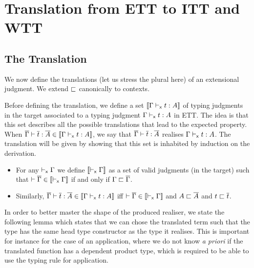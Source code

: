 \chapter{Translation from \acrshort{ETT} to \acrshort{ITT} and \acrshort{WTT}}

\section{The Translation}

We now define the translations (let us stress the plural here) of an
extensional judgment. We extend $\sqsubset$ canonically to contexts.

Before defining the translation, we define a set
$\llbracket \Gamma \vdash_{\mathsf{x}} t : A \rrbracket$ of typing judgments in the target associated to a
typing judgment $\Gamma \vdash_{\mathsf{x}} t : A$ in \acrshort{ETT}.
%
The idea is that this set describes all the possible translations that
lead to the expected property. When
$\overline{\Gamma} \vdash \overline{t} : \overline{A} \in \llbracket \Gamma \vdash_{\mathsf{x}} t : A \rrbracket$, we say that
$\overline{\Gamma} \vdash \overline{t} : \overline{A}$ realises $\Gamma \vdash_{\mathsf{x}} t : A$. The
translation will be given by showing that this set is inhabited by
induction on the derivation.

\begin{definition}
  \leavevmode
  \begin{itemize}
    \item For any $\vdash_{\mathsf{x}} \Gamma$ we define $\llbracket \vdash_{\mathsf{x}} \Gamma \rrbracket$ as a set of
    valid judgments (in the target) such that
    $\vdash \overline{\Gamma} \in \llbracket \vdash_{\mathsf{x}} \Gamma \rrbracket$ if and only if $\Gamma \sqsubset \overline{\Gamma}$.

    \item Similarly, $\overline{\Gamma} \vdash \overline{t} : \overline{A} \in \llbracket \Gamma \vdash_{\mathsf{x}} t : A \rrbracket$
    iff $\vdash \overline{\Gamma} \in \llbracket \vdash_{\mathsf{x}} \Gamma \rrbracket$ and $A \sqsubset \overline{A}$ and $t \sqsubset \overline{t}$.
  \end{itemize}
\end{definition}

In order to better master the shape of the produced realiser, we state the
following lemma which states that we can chose the translated term such that
the type has the same head type constructor as the type it realises.
%
This is important for instance for the case of an application, where we
do not know \emph{a priori} if the translated function has a dependent product
type, which is required to be able to use the typing rule for application.

